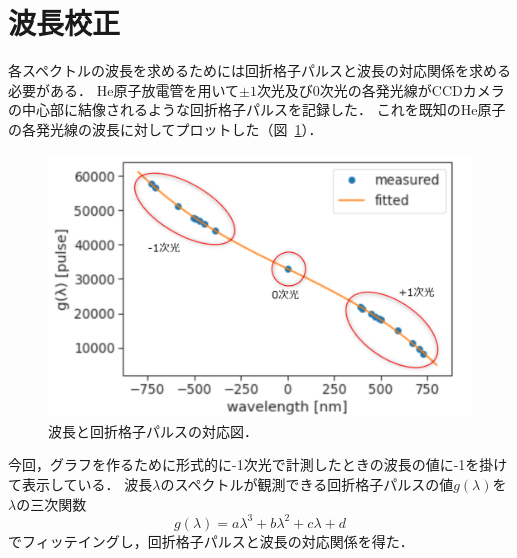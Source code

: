 \section{波長校正}
\label{sec:wavelength_calibration}
各スペクトルの波長を求めるためには回折格子パルスと波長の対応関係を求める必要がある．
He原子放電管を用いて$\pm{1}$次光及び0次光の各発光線がCCDカメラの中心部に結像されるような回折格子パルスを記録した．
これを既知のHe原子の各発光線の波長に対してプロットした（図\ \ref{fig:lambda-grating_fitting}）．
\begin{figure}[htbp]
    \centering
    \includegraphics[scale=0.5]{figure/lambda-grating_fitting.pdf}
     \caption{波長と回折格子パルスの対応図．\\
     }
     \label{fig:lambda-grating_fitting}
\end{figure}
今回，グラフを作るために形式的に-1次光で計測したときの波長の値に-1を掛けて表示している．
波長$\lambda$のスペクトルが観測できる回折格子パルスの値$g(\lambda)$を$\lambda$の三次関数
\begin{equation}
     g(\lambda) = a\lambda^3+b\lambda^2+c\lambda+d
\end{equation}
でフィッテイングし，回折格子パルスと波長の対応関係を得た．




